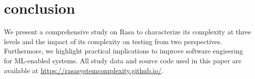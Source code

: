 
\vspace{-3pt}
\section{conclusion}
\vspace{-3pt}


We present a comprehensive study on Rasa to characterize its complexity at three levels and the impact of its complexity on testing from two perspectives.
Furthermore, we highlight practical implications to improve software engieering for ML-enabled systems.
All study data and source code used in this paper are available at \url{https://rasasystemcomplexity.github.io/}.
